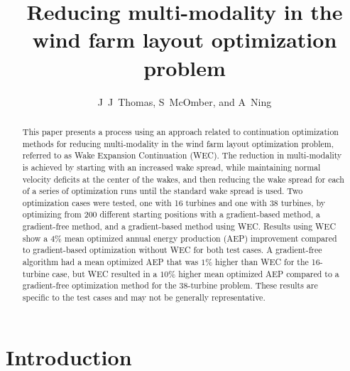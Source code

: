 \documentclass[a4paper]{jpconf}
\begin{document}
\title{Reducing multi-modality in the wind farm layout optimization problem}

\author{J~J~Thomas, S~McOmber, and A~Ning}
\address{Department of Mechanical Engineering,
Brigham Young University, Provo, Utah, USA}

\begin{abstract}
	This paper presents a process using an approach related to  continuation optimization methods for reducing multi-modality in the wind farm layout optimization problem, referred to as Wake Expansion Continuation (WEC). The reduction in multi-modality is achieved by starting with an increased wake spread, while maintaining normal velocity deficits at the center of the wakes, and then reducing the wake spread for each of a series of optimization runs until the standard wake spread is used. Two optimization cases were tested, one with 16 turbines and one with 38 turbines, by optimizing from 200 different starting positions with a gradient-based method, a gradient-free method, and a gradient-based method using WEC. Results using WEC show a $4\%$ mean optimized annual energy production (AEP) improvement compared to gradient-based optimization without WEC for both test cases. A gradient-free algorithm had a mean optimized AEP that was $1\%$ higher than WEC for the 16-turbine case, but WEC resulted in a $10\%$ higher mean optimized AEP compared to a gradient-free optimization method for the 38-turbine problem. These results are specific to the test cases and may not be generally representative.
\end{abstract}

\section{Introduction}
\end{document}
